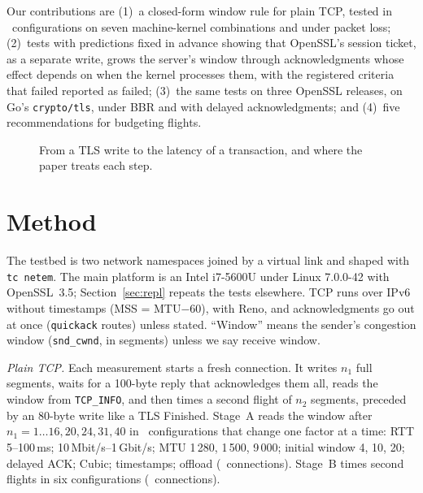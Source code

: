 \documentclass[sigconf,9pt,nonacm]{acmart}
\newcommand{\ms}{\,ms\xspace}
\begin{document}
Our contributions are (1)~a closed-form window rule for plain TCP, tested in \NCfg\ configurations on seven machine-kernel combinations and under packet loss; (2)~tests with predictions fixed in advance showing that OpenSSL's session ticket, as a separate write, grows the server's window through acknowledgments whose effect depends on when the kernel processes them, with the registered criteria that failed reported as failed; (3)~the same tests on three OpenSSL releases, on Go's \texttt{crypto/tls}, under BBR and with delayed acknowledgments; and (4)~five recommendations for budgeting flights.

\begin{figure}[t]
\centering
{}
\caption{From a TLS write to the latency of a transaction, and where the paper treats each step.}
\label{fig:overview}
\end{figure}

\section{Method}
The testbed is two network namespaces joined by a virtual link and shaped with \texttt{tc netem}. The main platform is an Intel i7-5600U under Linux 7.0.0-42 with OpenSSL~3.5; Section~\ref{sec:repl} repeats the tests elsewhere. TCP runs over IPv6 without timestamps (MSS = MTU$-60$), with Reno, and acknowledgments go out at once (\texttt{quickack} routes) unless stated. ``Window'' means the sender's congestion window (\texttt{snd\_cwnd}, in segments) unless we say receive window.

\emph{Plain TCP.} Each measurement starts a fresh connection. It writes $n_1$ full segments, waits for a 100-byte reply that acknowledges them all, reads the window from \texttt{TCP\_INFO}, and then times a second flight of $n_2$ segments, preceded by an 80-byte write like a TLS Finished. Stage~A reads the window after $n_1=1\ldots16,20,24,31,40$ in \NCfg\ configurations that change one factor at a time: RTT 5--100\ms; 10\,Mbit/s--1\,Gbit/s; MTU 1\,280, 1\,500, 9\,000; initial window 4, 10, 20; delayed ACK; Cubic; timestamps; offload (\NStageA\ connections). Stage~B times second flights in six configurations (\NStageB\ connections).
\end{document}
